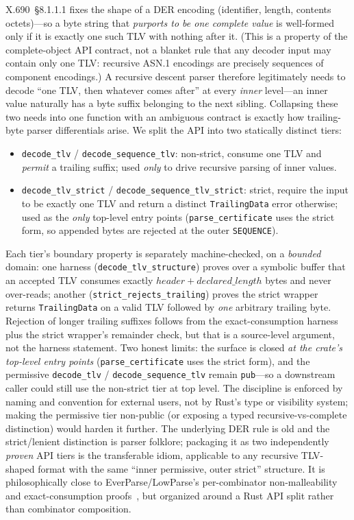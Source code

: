 \documentclass[10pt,twocolumn]{article}
\newcommand{\code}[1]{\texttt{\small #1}}
\begin{document}
X.690~\S8.1.1.1 fixes the shape of a DER encoding (identifier, length, contents
octets)---so a byte string that \emph{purports to be one complete value} is
well-formed only if it is exactly one such TLV with nothing after it. (This is a
property of the complete-object API contract, not a blanket rule that any
decoder input may contain only one TLV: recursive ASN.1 encodings are precisely
sequences of component encodings.) A recursive descent parser therefore
legitimately needs to decode ``one TLV, then whatever comes after'' at every
\emph{inner} level---an inner value naturally has a byte suffix belonging to the
next sibling. Collapsing these two needs into one function with an ambiguous
contract is exactly how
trailing-byte parser differentials arise. We split the API into two statically
distinct tiers:
\begin{itemize}
\item \code{decode\_tlv} / \code{decode\_sequence\_tlv}: non-strict, consume
  one TLV and \emph{permit} a trailing suffix; used \emph{only} to drive
  recursive parsing of inner values.
\item \code{decode\_tlv\_strict} / \code{decode\_sequence\_tlv\_strict}:
  strict, require the input to be exactly one TLV and return a distinct
  \code{TrailingData} error otherwise; used as the \emph{only} top-level entry
  points (\code{parse\_certificate} uses the strict form, so appended bytes are
  rejected at the outer \code{SEQUENCE}).
\end{itemize}
Each tier's boundary property is separately machine-checked, on a
\emph{bounded} domain: one harness (\code{decode\_tlv\_structure}) proves over a
symbolic buffer that an accepted TLV consumes exactly
$\mathit{header}+\mathit{declared\_length}$ bytes and never over-reads; another
(\code{strict\_rejects\_trailing}) proves the strict wrapper returns
\code{TrailingData} on a valid TLV followed by \emph{one} arbitrary trailing
byte. Rejection of longer trailing suffixes follows from the exact-consumption
harness plus the strict wrapper's remainder check, but that is a source-level
argument, not the harness statement. Two honest limits: the surface is closed
\emph{at the crate's top-level entry points} (\code{parse\_certificate} uses the
strict form), and the permissive \code{decode\_tlv} / \code{decode\_sequence\_tlv}
remain \code{pub}---so a downstream caller could still use the non-strict tier at
top level. The discipline is enforced by naming and convention for external
users, not by Rust's type or visibility system; making the permissive tier
non-public (or exposing a typed recursive-vs-complete distinction) would harden
it further. The underlying DER rule is old and the strict/lenient distinction is
parser folklore; packaging it as two independently \emph{proven} API tiers is
the transferable idiom, applicable to any recursive TLV-shaped format with the
same ``inner permissive, outer strict'' structure. It is philosophically close
to EverParse/LowParse's per-combinator non-malleability and exact-consumption
proofs~\cite{everparse}, but organized around a Rust API split rather than
combinator composition.
\end{document}
